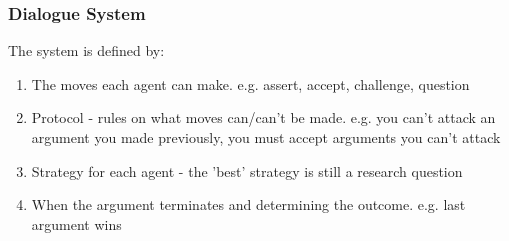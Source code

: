 \subsubsection{Dialogue System}
The system is defined by:
\begin{enumerate}
    \item The moves each agent can make. e.g. assert, accept, challenge, question
    \item Protocol - rules on what moves can/can't be made. e.g. you can't attack an argument you made previously, you must accept arguments you can't attack
    \item Strategy for each agent - the 'best' strategy is still a research question
    \item When the argument terminates and determining the outcome. e.g. last argument wins
\end{enumerate}